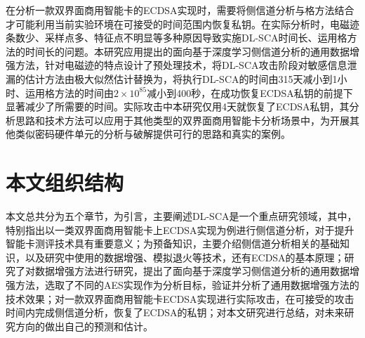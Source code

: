 {{	在分析一款双界面商用智能卡的ECDSA实现时，需要将侧信道分析与格方法结合才可能利用当前实验环境在可接受的时间范围内恢复私钥。在实际分析时，电磁迹条数少、采样点多、特征点不明显等多种原因导致实施DL-SCA时间长、运用格方法的时间长的问题。本研究应用提出的面向基于深度学习侧信道分析的通用数据增强方法，针对电磁迹的特点设计了\yuchuli 预处理技术，将DL-SCA攻击阶段对敏感信息泄漏的估计方法由极大似然估计替换为\jiashejianyanguji，将执行DL-SCA的时间由315天减小到1小时、运用格方法的时间由$2\times10^{85}$减小到400秒，在成功恢复ECDSA私钥的前提下显著减少了所需要的时间。实际攻击中本研究仅用4天就恢复了ECDSA私钥，其分析思路和技术方法可以应用于其他类型的双界面商用智能卡分析场景中，为开展其他类似密码硬件单元的分析与破解提供可行的思路和真实的案例。
	}
	\section{本文组织结构}
	本文总共分为五个章节，为引言，主要阐述DL-SCA是一个重点研究领域，其中，特别指出以一类双界面商用智能卡上ECDSA实现为例进行侧信道分析，对于提升智能卡测评技术具有重要意义；为预备知识，主要介绍侧信道分析相关的基础知识，以及研究中使用的数据增强、模拟退火等技术，还有ECDSA的基本原理；研究了对数据增强方法进行研究，提出了面向基于深度学习侧信道分析的通用数据增强方法，选取了不同的AES实现作为分析目标，验证并分析了通用数据增强方法的技术效果；对一款双界面商用智能卡ECDSA实现进行实际攻击，在可接受的攻击时间内完成侧信道分析，恢复了ECDSA的私钥；对本文研究进行总结，对未来研究方向的做出自己的预测和估计。
}